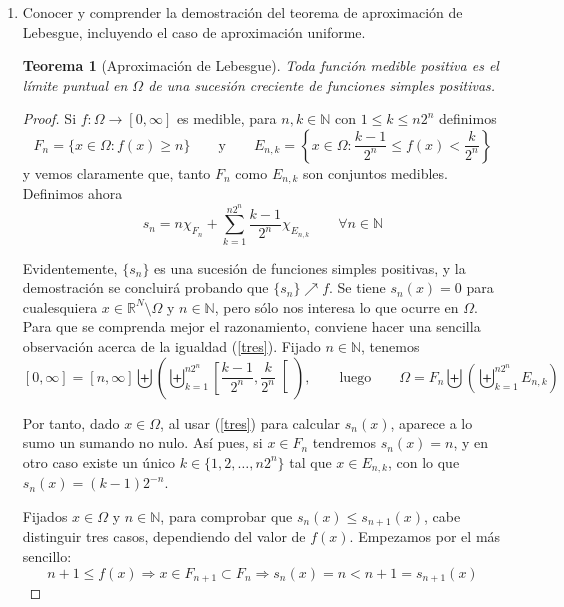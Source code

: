 \documentclass[a4paper, 12pt]{article}
\newtheorem*{teorema*}{Teorema}
\begin{document}
\begin{enumerate}[label=\textbf{\arabic*}.]
\bigskip

\item Conocer y comprender la demostración del teorema de aproximación de Lebesgue, incluyendo el caso de aproximación uniforme.

\begin{teorema*}[Aproximación de Lebesgue]
Toda función medible positiva es el límite puntual en \(\Omega\) de una sucesión creciente de funciones simples positivas.
\end{teorema*}

\begin{proof}
Si \(f: \Omega \to [0, \infty]\) es medible, para \(n,k \in \mathbb{N}\) con \(1 \leq k \leq n 2^n\) definimos
\[
	F_n = \{x \in \Omega: f(x) \geq n\} \qquad \text{y} \qquad E_{n,k} = \left\{ x \in \Omega : \frac{k-1}{2^n} \leq f(x) < \frac{k}{2^n}\right\}
\]
y vemos claramente que, tanto \(F_n\) como \(E_{n,k}\) son conjuntos medibles. Definimos ahora
\begin{equation}\label{tres}
	s_n = n \chi_{F_n} + \sum_{k= 1}^{n 2^n} \frac{k-1}{2^n} \chi_{E_{n,k}} \qquad \forall n \in \mathbb{N}
\end{equation}

Evidentemente, \(\{s_n\}\) es una sucesión de funciones simples positivas, y la demostración se concluirá probando que \(\{s_n\} \nearrow f\). Se tiene \(s_n(x) = 0\) para cualesquiera \(x \in \mathbb{R}^N \setminus \Omega\) y \(n \in \mathbb{N}\), pero sólo nos interesa lo que ocurre en \(\Omega\). Para que se comprenda mejor el razonamiento, conviene hacer una sencilla observación acerca de la igualdad (\ref{tres}). Fijado \(n \in \mathbb{N}\), tenemos
\[
	[0, \infty] = [n, \infty] \biguplus \left( \biguplus_{k=1}^{n 2^n} \left[ \frac{k-1}{2^n}, \frac{k}{2^n} \right[ \right), \qquad \text{luego} \qquad \Omega = F_n \biguplus \left( \biguplus_{k=1}^{n 2^n} E_{n,k} \right)
\]

Por tanto, dado \(x \in \Omega\), al usar (\ref{tres}) para calcular \(s_n(x)\), aparece a lo sumo un sumando no nulo. Así pues, si \(x \in F_n\) tendremos \(s_n(x) = n\), y en otro caso existe un único \(k \in \{1,2,\dotsc,n 2^n\}\) tal que \(x \in E_{n,k}\), con lo que \(s_n(x) = (k-1) 2^{-n}\).

Fijados \(x \in \Omega\) y \(n \in \mathbb{N}\), para comprobar que \(s_n (x) \leq s_{n+1} (x)\), cabe distinguir tres casos, dependiendo del valor de \(f(x)\). Empezamos por el más sencillo:
\[
	n+1 \leq f(x) \Rightarrow x \in F_{n+1} \subset F_n \Rightarrow s_n(x) = n < n + 1 = s_{n+1} (x)
\]


\end{proof}
\end{enumerate}
\end{document}
